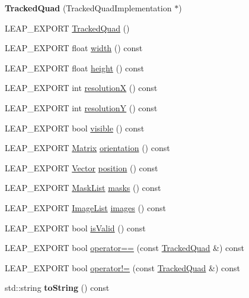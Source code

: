 \begin{DoxyCompactItemize}
\item 
\mbox{\label{class_leap_1_1_tracked_quad_af6d46e9ed1a347775af7ac44e3b42194}} 
{\bfseries Tracked\+Quad} (Tracked\+Quad\+Implementation $\ast$)
\item 
L\+E\+A\+P\+\_\+\+E\+X\+P\+O\+RT \hyperlink{class_leap_1_1_tracked_quad_a58cbed47b386a0a4273c8e2f5eb9cd25}{Tracked\+Quad} ()
\item 
L\+E\+A\+P\+\_\+\+E\+X\+P\+O\+RT float \hyperlink{class_leap_1_1_tracked_quad_ada574f601b0b78188d61e9a47342337f}{width} () const
\item 
L\+E\+A\+P\+\_\+\+E\+X\+P\+O\+RT float \hyperlink{class_leap_1_1_tracked_quad_abce390c8b28040de3062cddfcf2c532a}{height} () const
\item 
L\+E\+A\+P\+\_\+\+E\+X\+P\+O\+RT int \hyperlink{class_leap_1_1_tracked_quad_a2adfad3946e7333ba91760161f9ec3f6}{resolutionX} () const
\item 
L\+E\+A\+P\+\_\+\+E\+X\+P\+O\+RT int \hyperlink{class_leap_1_1_tracked_quad_ac74149a92d09d9549e934afc42eae434}{resolutionY} () const
\item 
L\+E\+A\+P\+\_\+\+E\+X\+P\+O\+RT bool \hyperlink{class_leap_1_1_tracked_quad_ac03a01d07228515363eb81ace6cd2d99}{visible} () const
\item 
L\+E\+A\+P\+\_\+\+E\+X\+P\+O\+RT \hyperlink{struct_leap_1_1_matrix}{Matrix} \hyperlink{class_leap_1_1_tracked_quad_ac382fefda8c3c3d4dc8791d7f74d1a56}{orientation} () const
\item 
L\+E\+A\+P\+\_\+\+E\+X\+P\+O\+RT \hyperlink{struct_leap_1_1_vector}{Vector} \hyperlink{class_leap_1_1_tracked_quad_a3c5aac36dc71997c5244fc9d248ae98f}{position} () const
\item 
L\+E\+A\+P\+\_\+\+E\+X\+P\+O\+RT \hyperlink{class_leap_1_1_mask_list}{Mask\+List} \hyperlink{class_leap_1_1_tracked_quad_a36aa583b32b798ffd94c1a11c3f00d40}{masks} () const
\item 
L\+E\+A\+P\+\_\+\+E\+X\+P\+O\+RT \hyperlink{class_leap_1_1_image_list}{Image\+List} \hyperlink{class_leap_1_1_tracked_quad_ae0d15342d6e8ce286d137feb971d0a50}{images} () const
\item 
L\+E\+A\+P\+\_\+\+E\+X\+P\+O\+RT bool \hyperlink{class_leap_1_1_tracked_quad_a5e7e10b0dad60d0951fcb0eae67b2300}{is\+Valid} () const
\item 
L\+E\+A\+P\+\_\+\+E\+X\+P\+O\+RT bool \hyperlink{class_leap_1_1_tracked_quad_a728752126b184f5e8d2bc22b77897662}{operator==} (const \hyperlink{class_leap_1_1_tracked_quad}{Tracked\+Quad} \&) const
\item 
L\+E\+A\+P\+\_\+\+E\+X\+P\+O\+RT bool \hyperlink{class_leap_1_1_tracked_quad_aff1ee3d987b9f4d0fe099339fbf889bb}{operator!=} (const \hyperlink{class_leap_1_1_tracked_quad}{Tracked\+Quad} \&) const
\item 
\mbox{\label{class_leap_1_1_tracked_quad_a904246d360485e47c506c3f0c17095dd}} 
std\+::string {\bfseries to\+String} () const
\end{DoxyCompactItemize}
